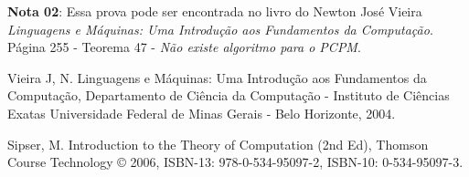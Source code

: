 \documentclass[12pt, a4paper]{article}
\begin{document}
\qquad \textbf{Nota 02}: Essa prova pode ser encontrada no livro do Newton José Vieira \textit{Linguagens e Máquinas: Uma Introdução aos Fundamentos da Computação}. Página 255 - Teorema 47 - \textit{Não existe algoritmo para o PCPM}.

\pagebreak
\begin{thebibliography}{99}
 Vieira J, N. Linguagens e Máquinas: Uma Introdução aos Fundamentos da Computação, Departamento de Ciência da Computação - Instituto de Ciências Exatas Universidade Federal de Minas Gerais - Belo Horizonte, 2004.

 Sipser, M. Introduction to the Theory of Computation (2nd Ed), Thomson Course Technology © 2006, ISBN-13: 978-0-534-95097-2, ISBN-10: 0-534-95097-3.
\end{thebibliography}
\end{document}
